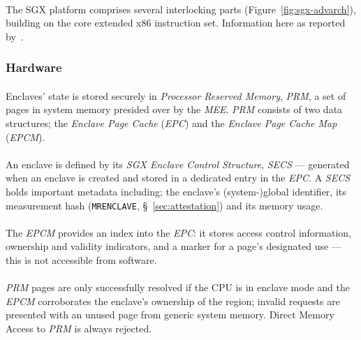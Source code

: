 \paragraph{} The SGX platform comprises several interlocking parts (Figure~\ref{fig:sgx-advarch}), building on the core extended x86 instruction set. Information here as reported by~\cite{sgx-sgx-reference,Costan2016IntelSE}.

\subsubsection{Hardware}
\paragraph{} Enclaves' state is stored securely in \textit{Processor Reserved Memory}, \textit{PRM}, a set of pages in system memory presided over by the \textit{MEE}. \textit{PRM} consists of two data structures; the \textit{Enclave Page Cache} (\textit{EPC}) and the \textit{Enclave Page Cache Map} (\textit{EPCM}).

\paragraph{} An enclave is defined by its \textit{SGX Enclave Control Structure}, \textit{SECS} --- generated when an enclave is created and stored in a dedicated entry in the \textit{EPC}. A \textit{SECS} holds important metadata including; the enclave's (system-)global identifier, its measurement hash (\texttt{MRENCLAVE}, §~\ref{sec:attestation}) and its memory usage.

\paragraph{} The \textit{EPCM} provides an index into the \textit{EPC}: it stores access control information, ownership and validity indicators, and a marker for a page's designated use --- this is not accessible from software. 

\paragraph{} \textit{PRM} pages are only successfully resolved if the CPU is in enclave mode and the \textit{EPCM} corroborates the enclave's ownership of the region; invalid requests are presented with an unused page from generic system memory. Direct Memory Access to \textit{PRM} is always rejected.

